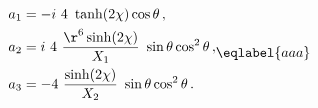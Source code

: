 \begin{equation}
\begin{split}
a_1&=- i\ 4\ \tanh(2\chi) \cos\theta\,, \\
a_2&=i\ 4\ \frac{\r^6\sinh(2\chi)}{X_1}\ \sin\theta\cos^2\theta\,,\\
a_3&=-4\  \frac{\sinh(2\chi)}{X_2}\ \sin\theta\cos^2\theta\,.
\end{split}
\eqlabel{aaa}
\end{equation}

